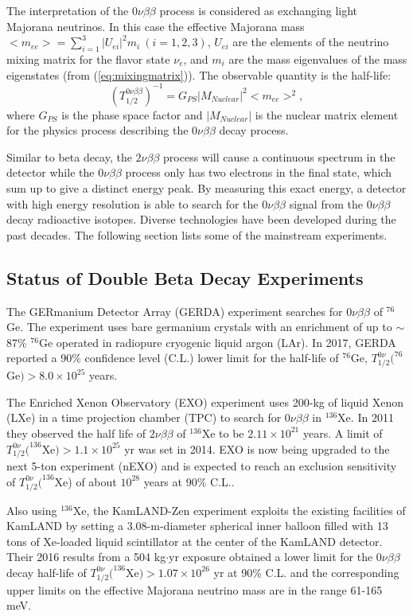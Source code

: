 \documentclass[preprint,12pt]{elsarticle}
\numberwithin{equation}{section}
\begin{document}
The interpretation of the $0\nu\beta\beta$ process is considered as exchanging light Majorana neutrinos. In this case the effective Majorana mass $<m_{ee}>=\sum_{i=1}^{3} |U_{ei}|^2m_i~(i=1,2,3)$, $U_{ei}$ are the elements of the neutrino mixing matrix for the flavor state $\nu_e$, and $m_i$ are the mass eigenvalues of the mass eigenstates (from (\ref{eq:mixingmatrix})). The observable quantity is the half-life:
\[
(T^{0\nu\beta\beta}_{1/2})^{-1} = G_{PS}|M_{Nuclear}|^2<m_{ee}>^2, 
\]
where $G_{PS}$ is the phase space factor and $|M_{Nuclear}|$ is the nuclear matrix element for the physics process describing the $0\nu\beta\beta$ decay process\cite{kaizuber}.

Similar to beta decay, the $2\nu\beta\beta$ process will cause a continuous spectrum in the detector while the $0\nu\beta\beta$ process only has two electrons in the final state, which sum up to give a distinct energy peak. By measuring this exact energy, a detector with high energy resolution is able to search for the $0\nu\beta\beta$ signal from the $0\nu\beta\beta$ decay radioactive isotopes. Diverse technologies have been developed during the past decades. The following section lists some of the mainstream experiments.

\subsection{Status of Double Beta Decay Experiments}
The GERmanium Detector Array (GERDA) experiment searches for $0\nu\beta\beta$ of $^{76}$Ge. The experiment uses bare germanium crystals with an enrichment of up to $\sim$87\% $^{76}$Ge operated in radiopure cryogenic liquid argon (LAr). In 2017, GERDA reported a 90\% confidence level (C.L.) lower limit for the half-life of $^{76}$Ge, $T^{0\nu}_{1/2}(^{76}$Ge$)>8.0\times 10^{25}$ years\cite{gerda,gerda2,gerda2018}.

The Enriched Xenon Observatory (EXO) experiment uses 200-kg of liquid Xenon (LXe) in a time projection chamber (TPC) to search for $0\nu\beta\beta$ in $^{136}$Xe. In 2011 they observed the half life of $2\nu\beta\beta$ of $^{136}$Xe to be $2.11\times 10^{21}$ years. A limit of $T^{0\nu}_{1/2}(^{136}$Xe$)>1.1\times 10^{25}$ yr\cite{exo} was set in 2014. EXO is now being upgraded to the next 5-ton experiment (nEXO) and is expected to reach an exclusion sensitivity of $T^{0\nu}_{1/2}(^{136}$Xe) of about $10^{28}$ years at 90\% C.L.\cite{nEXO}.

Also using $^{136}$Xe, the KamLAND-Zen experiment exploits the existing facilities of KamLAND by setting a 3.08-m-diameter spherical inner balloon filled with 13 tons of Xe-loaded liquid scintillator at the center of the KamLAND detector. Their 2016 results from a 504 kg$\cdot$yr exposure obtained a lower limit for the $0\nu\beta\beta$ decay half-life of $T^{0\nu}_{1/2}(^{136}$Xe$)>1.07\times 10^{26}$ yr at 90\% C.L. and the corresponding upper limits on the effective Majorana neutrino mass are in the range 61-165 meV\cite{kamlandZen}.
\end{document}

